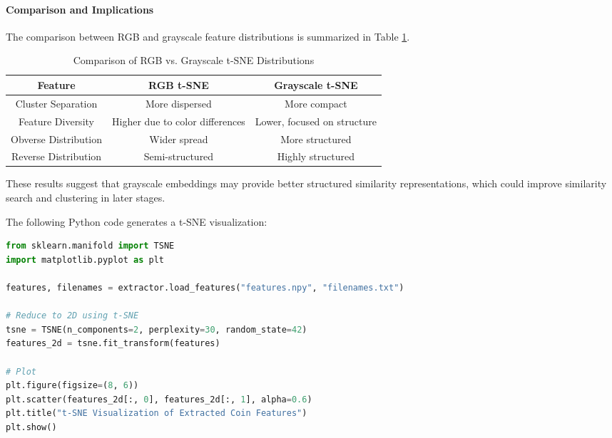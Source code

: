 \documentclass[nolibertine, english, algorithm, nomencl, minted]{ttlab-qualify}
\begin{document}
\paragraph{Comparison and Implications}
The comparison between RGB and grayscale feature distributions is summarized in Table \ref{tab:tsne_comparison}.

\begin{table}[H]
    \centering
    \begin{tabular}{|c|c|c|}
        \hline
        Feature & RGB t-SNE & Grayscale t-SNE \\
        \hline
        Cluster Separation & More dispersed & More compact \\
        Feature Diversity & Higher due to color differences & Lower, focused on structure \\
        Obverse Distribution & Wider spread & More structured \\
        Reverse Distribution & Semi-structured & Highly structured \\
        \hline
    \end{tabular}
    \caption{Comparison of RGB vs. Grayscale t-SNE Distributions}
    \label{tab:tsne_comparison}
\end{table}

These results suggest that grayscale embeddings may provide better structured similarity representations, 
which could improve similarity search and clustering in later stages.


The following Python code generates a t-SNE visualization:

\begin{footnotesize}
\begin{lstlisting}[language=Python, frame=single, breaklines=true]
from sklearn.manifold import TSNE
import matplotlib.pyplot as plt

features, filenames = extractor.load_features("features.npy", "filenames.txt")

# Reduce to 2D using t-SNE
tsne = TSNE(n_components=2, perplexity=30, random_state=42)
features_2d = tsne.fit_transform(features)

# Plot
plt.figure(figsize=(8, 6))
plt.scatter(features_2d[:, 0], features_2d[:, 1], alpha=0.6)
plt.title("t-SNE Visualization of Extracted Coin Features")
plt.show()
\end{lstlisting}
\end{footnotesize}
\end{document}
